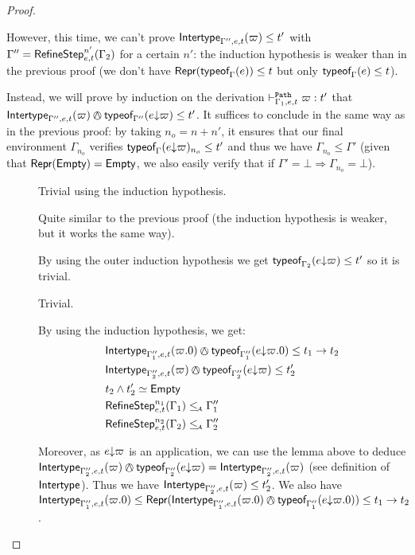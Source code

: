 \documentclass[a4paper]{article}
\theoremstyle{definition}
\begin{document}
\begin{proof}
\begin{description}
      However, this time, we can't prove $\textsf{Intertype}_{\Gamma'',e,t} (\varpi) \leq t'$ with $\Gamma'' = \textsf{RefineStep}_{e,t}^{n'} (\Gamma_2)$
      for a certain $n'$: the induction hypothesis is weaker than in the previous proof
      (we don't have $\textsf{Repr}(\textsf{typeof}_{\Gamma}(e)) \leq t$ but only $\textsf{typeof}_{\Gamma}(e) \leq t$).
      
      Instead, we will prove by induction on the derivation $\vdash^{\texttt{Path}}_{\Gamma_1,e,t} \varpi:t'$ that
      $\env {\Gamma'',e,t} (\varpi) \tsand \tyof {\occ e \varpi} {\Gamma''} \leq t'$.
      It suffices to conclude in the same way as in the previous proof:
      by taking $n_o = n+n'$,
      it ensures that our final environment $\Gamma_{n_o}$ verifies $\textsf{typeof}_{\Gamma}(e{\downarrow}\varpi)_{n_o} \leq t'$
      and thus we have $\Gamma_{n_o} \leq \Gamma'$
      (given that $\textsf{Repr}(\textsf{Empty}) = \textsf{Empty}$, we also easily verify that if $\Gamma' = \bot \Rightarrow \Gamma_{n_o}=\bot$).

      \begin{description}
        \item[] Trivial using the induction hypothesis.
        \item[] Quite similar to the previous proof (the induction hypothesis is weaker, but it works the same way).
        \item[] By using the outer induction hypothesis we get $\textsf{typeof}_{\Gamma_2}(e{\downarrow}\varpi) \leq t'$ so it is trivial.
        \item[] Trivial.
        \item[] By using the induction hypothesis, we get:
        \begin{align*}
          &\env {\Gamma_1'',e,t} (\varpi.0) \tsand \tyof {\occ e {\varpi.0}} {\Gamma_1''} \leq \arrow {t_1} {t_2}\\
          &\env {\Gamma_2'',e,t} (\varpi) \tsand \tyof {\occ e {\varpi}} {\Gamma_2''} \leq t_2'\\
          &t_2 \land t_2' \simeq \Empty\\
          &\RefineStep {e,t}^{n_1} (\Gamma_1) \leqA \Gamma_1''\\
          &\RefineStep {e,t}^{n_2} (\Gamma_2) \leqA \Gamma_2''
        \end{align*}

        Moreover, as $e{\downarrow}\varpi$ is an application, we can use the lemma above to deduce
        $\env {\Gamma_2'',e,t} (\varpi) \tsand \tyof {\occ e {\varpi}} {\Gamma_2''} = \env {\Gamma_2'',e,t} (\varpi)$
        (see definition of $\textsf{Intertype}_{}$).
        Thus we have $\textsf{Intertype}_{\Gamma_2'',e,t} (\varpi) \leq t_2'$.
        We also have $\env {\Gamma_1'',e,t} (\varpi.0) \leq \tsrep{\env {\Gamma_1'',e,t} (\varpi.0) \tsand \tyof {\occ e {\varpi.0}} {\Gamma_1''}} \leq \arrow {t_1} {t_2}$.


\end{description}
\end{description}
\end{proof}
\end{document}
